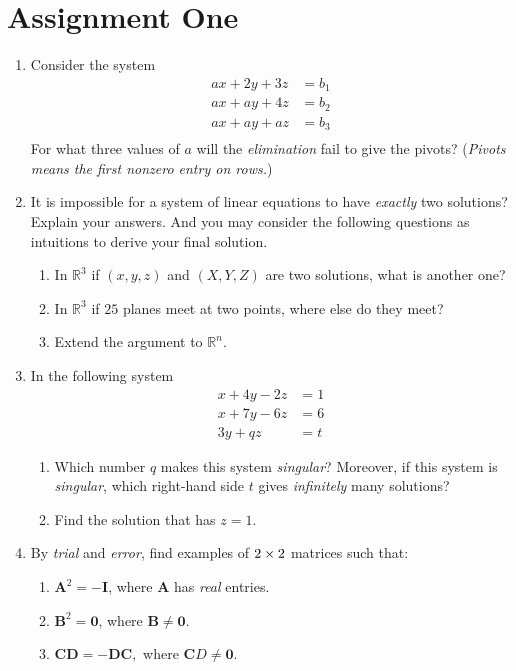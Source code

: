 \section{Assignment One}
\begin{enumerate}
\item
Consider the system
\begin{align*}
ax+2y+3z&=b_1\\
ax+ay+4z&=b_2\\
ax+ay+az&=b_3\\
\end{align*}
For what three values of $a$ will the \textit{elimination} fail to give the pivots? (\textit{Pivots means the first nonzero entry on rows.})
\item
It is impossible for a system of linear equations to have \textit{exactly} two solutions? Explain your answers. And you may consider the following questions as intuitions to derive your final solution.
\begin{enumerate}
\item
In $\mathbb{R}^3$ if $(x,y,z)$ and $(X,Y,Z)$ are two solutions, what is another one?
\item
In $\mathbb{R}^3$ if $25$ planes meet at two points, where else do they meet?
\item
Extend the argument to $\mathbb{R}^n.$
\end{enumerate}
\item
In the following system
\begin{align*}
x+4y-2z&=1\\
x+7y-6z&=6\\
3y+qz&=t
\end{align*}
\begin{enumerate}
\item
Which number $q$ makes this system \textit{singular}? Moreover, if this system is \textit{singular}, which right-hand side $t$ gives \textit{infinitely} many solutions?
\item
Find the solution that has $z=1.$
\end{enumerate}
\item
By \emph{trial} and \emph{error}, find examples of $2\times 2$ matrices such that:
\begin{enumerate}
\item
$\bm A^2=-\bm I$, where $\bm A$ has \textit{real} entries.
\item
$\bm B^2=\bm0$, where $\bm B\ne\bm0.$
\item
$\bm{CD}=-\bm{DC},$ where $\bm CD\ne\bm0.$

\end{enumerate}
\end{enumerate}
